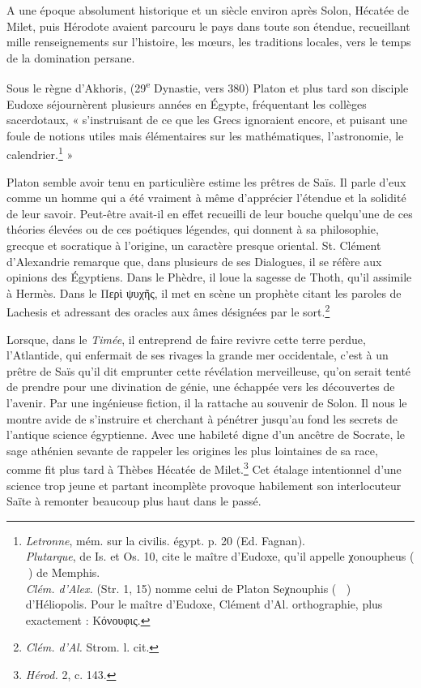 \documentclass[a4paper, 11pt, oneside]{article}
\newcommand*\hieroglyhicsAABR{}
\newcommand*\hieroglyhicsAACH{}
\newcommand*\hieroglyhicsAADB{}
\newcommand*\hieroglyhicsAAEB{}
\newcommand*\hieroglyhicsAAFB{}
\newcommand*\hieroglyhicsAALE{}
\newcommand*\hieroglyhicsAALF{}
\begin{document}
A une époque absolument historique et un siècle environ après Solon, Hécatée de Milet, puis Hérodote avaient parcouru le pays dans toute son étendue, recueillant mille renseignements sur l'histoire, les mœurs, les traditions locales, vers le temps de la domination persane.

Sous le règne d'Akhoris, (29\textsuperscript{e} Dynastie, vers 380) Platon et plus tard son disciple Eudoxe séjournèrent plusieurs années en Égypte, fréquentant les collèges sacerdotaux, « s'instruisant de ce que les Grecs ignoraient encore, et puisant une foule de notions utiles mais élémentaires sur les mathématiques, l'astronomie, le calendrier.\footnote{\emph{Letronne}, mém. sur la civilis. égypt. p. 20 (Ed. Fagnan).\\\hspace*{5mm}\emph{Plutarque}, de Is. et Os. 10, cite le maître d'Eudoxe, qu'il appelle χonoupheus ($\hieroglyhicsAALE\:\hieroglyhicsAAFB$) de Memphis.\\\hspace*{5mm}\emph{Clém. d'Alex.} (Str. 1, 15) nomme celui de Platon Seχnouphis ($\hieroglyhicsAALF\:\hieroglyhicsAACH\:\hieroglyhicsAABR\allowbreak\:\hieroglyhicsAADB\:\hieroglyhicsAAEB$) d'Héliopolis. Pour le maître d'Eudoxe, Clément d'Al. orthographie, plus exactement : Κόνουφις.} »

Platon semble avoir tenu en particulière estime les prêtres de Saïs. Il parle d'eux comme un homme qui a été vraiment à même d'apprécier l'étendue et la solidité de leur savoir. Peut-être avait-il en effet recueilli de leur bouche quelqu'une de ces théories élevées ou de ces poétiques légendes, qui donnent à sa philosophie, grecque et socratique à l'origine, un caractère presque oriental. St. Clément d'Alexandrie remarque que, dans plusieurs de ses Dialogues, il se réfère aux opinions des Égyptiens. Dans le Phèdre, il loue la sagesse de Thoth, qu'il assimile à Hermès. Dans le Περὶ ψυχῆς, il met en scène un prophète citant les paroles de Lachesis et adressant des oracles aux âmes désignées par le sort.\footnote{\emph{Clém. d'Al.} Strom. l. cit.}

Lorsque, dans le \emph{Timée}, il entreprend de faire revivre cette terre perdue, l'Atlantide, qui enfermait de ses rivages la grande mer occidentale, c'est à un prêtre de Saïs qu'il dit emprunter cette révélation merveilleuse, qu'on serait tenté de prendre pour une divination de génie, une échappée vers les découvertes de l'avenir. Par une ingénieuse fiction, il la rattache au souvenir de Solon. Il nous le montre avide de s'instruire et cherchant à pénétrer jusqu'au fond les secrets de l'antique science égyptienne. Avec une habileté digne d'un ancêtre de Socrate, le sage athénien sevante de rappeler les origines les plus lointaines de sa race, comme fit plus tard à Thèbes Hécatée de Milet.\footnote{\emph{Hérod.} 2, c. 143.} Cet étalage intentionnel d'une science trop jeune et partant incomplète provoque habilement son interlocuteur Saïte à remonter beaucoup plus haut dans le passé.
\end{document}
